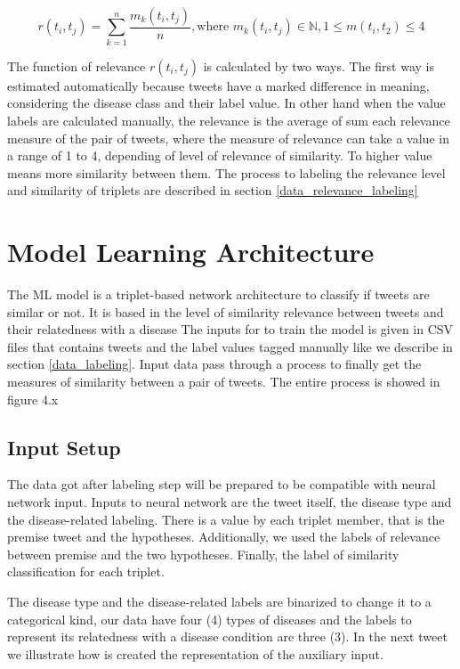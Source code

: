 \documentclass[12pt]{report}
\begin{document}
\begin{equation}
r(t_i, t_j) = \sum^n_{k=1} \frac{m_k(t_i, t_j)}{n}, \text{where } m_k(t_i,t_j) \in \mathbb{N}, 1 \leq m(t_i,t_2) \leq 4
\end{equation}

\noindent The function of relevance $r(t_i, t_j)$ is calculated by two ways. The first way is estimated automatically because tweets have a marked difference in meaning, considering the disease class and their label value. In other hand when the value labels are calculated manually, the relevance is the average of sum each relevance measure of the pair of tweets, where the measure of relevance can take a value in a range of 1 to 4, depending of level of relevance of similarity. To higher value means more similarity between them. The process to labeling the relevance level and similarity of triplets are described in section \ref{data_relevance_labeling}

\section{Model Learning Architecture}\label{models}

The \ac{ML} model is a triplet-based network architecture \cite {Wang2014} to classify if tweets are similar or not. It is based in the level of similarity relevance between tweets and their relatedness with a disease  The inputs for to train the model is given in \ac{CSV} files that contains tweets and the label values tagged manually like we describe in section \ref{data_labeling}. Input data pass through a process to finally get the measures of similarity between a pair of tweets. The entire process is showed in figure 4.x

\subsection{Input Setup}
The data got after labeling step will be prepared to be compatible with neural network input. Inputs to neural network are the tweet itself, the disease type and the disease-related labeling. There is a value by each triplet member, that is the premise tweet and the hypotheses. Additionally, we used the labels of relevance between premise and the two hypotheses. Finally, the label of similarity classification for each triplet.

The disease type and the disease-related labels are binarized to change it to a categorical kind, our data have four (4) types of diseases and the labels to represent its relatedness with a disease condition are three (3). In the next tweet we illustrate how is created the representation of the auxiliary input.
\end{document}
